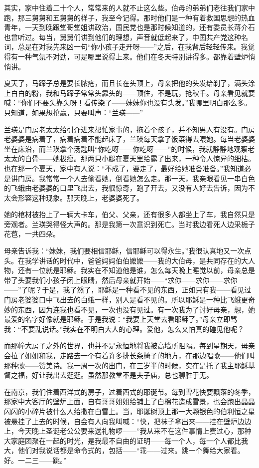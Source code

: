 \par 其实，家中住着二十个人，常常来的人就不止这么些。伯母的弟弟们老往我们家中跑，那三舅舅和五舅舅的样子，我至今记得。那时他们是一种有着救国思想的热血青年，一天到晚跟堂哥堂姐讲政治，国民党也是那时候知道的，还有委员长蒋介石也曾听过。每当，舅舅们讲到他们的理想，声音就低起来了，中国共产党这种名词，总是在对我先来凶一句“你小孩子走开呀——”之后，在我背后轻轻传来。我觉得有一种气氛不对劲，可是哪里说得上来。他们在冬天特别讲得多。都靠着壁炉悄悄讲。
\par 夏天了，马蹄子总是要长脓疮，而且长在头顶上，母亲把他的头发给剃了，满头涂上白白的粉，我和马蹄子常常头靠头的——顶住，不是玩，抢秋千。母亲看见就要喊：“你们不要头靠头呀！看传染了——妹妹你也没有头发。”我哪里明白那么多。只知道，如果想抢赢，只要叫声：“兰瑛——”
\par 兰瑛是门房老太太给引介进来帮忙家事的，拖着个孩子，并不知男人有没有。门房老婆婆是病着了，病着病着不能起床了，兰瑛每天拿了饭菜得去喂她。每当老婆婆坐在床沿，而兰瑛拿个汤匙叫“你吃呀——你吃呀——”的时候，我就静静地观察老太太的白骨——她极瘦。那两只小腿在夏天里给露了出来，一种令人惊异的细枯。也在那一个夏天，家中有人说：“不成了，要走了，最好给她准备准备。”我知道必是讲门房。我常常一个人去偷看她，倒看她怎么走。那一天，我亲眼看见一串白色的飞蛾由老婆婆的口里飞出去，我很惊奇，跑了开去，又没有人好去告诉，因为不太会形容这种现象。那天晚上，老婆婆死了。
\par 她的棺材被抬上了一辆大卡车，伯父、父亲，还有很多人都坐上了车，我自然只是旁观者。兰瑛哭得怪大声的。那是我第一次意识到死亡。当时我边看死人边采栀子花苞，一共四朵。
\par 母亲告诉我：“妹妹，我们要相信耶稣，信耶稣可以得永生。”我很认真地又一次点头。在我学讲话的时代中，爸爸妈妈伯伯嬷嬷——我的大伯母，是共同存在的大人物，还有一位就是耶稣。我实在不知道他是谁，怎么每天晚上睡觉以前，母亲总是带了头要我们小孩子闭上眼睛，然后母亲就开始——“求你——求你——求你——”了呢？于是，我了然了，耶稣是一种看不见的东西，正如只有我——看见过门房老婆婆口中飞出去的白蛾一样，别人是看不见的。所以耶稣是一种比飞蛾更奇妙的东西，因为连我也看不见，一次也没有见过。有一次我为了讨好母亲，想，她最爱的名字好像就是耶稣。于是我说：“我要上天堂去看耶稣了。”母亲立即骂我：“不要乱说话。”我实在不明白大人的心理。爱他，怎么又怕真的碰见他呢？
\par 而那幢大房子之外的世界，也并不是永恒地将我被高墙所阻隔。每到星期天，母亲会拉了姐姐和我，走路去一个有着许多排长条椅子的地方，在那边唱歌——他们叫那种歌——赞美诗。我一周一次的出门，在三岁半的时候，实在是托了我主耶稣基督之福，好让我出去逛逛。虽然那教堂不是夫子庙，总也聊胜于无。
\par 在南京，我们住着西洋式的房子，过着西式的耶诞节。每到雪花快要飘落的冬季，那家中大客厅的壁炉上面，自有哥哥姐姐给铺上了白棉花造成雪景，也会跑出晶晶闪闪的小碎片被什么人给撒在白雪上。当，耶诞树顶上那一大颗银色的伯利恒之星被悬挂了上去的时候，自会有人向我叫喊：“快，把袜子拿出来——挂在壁炉边边上，今天晚上圣诞老公公要来送礼物啰——”我从来不在这件事情上费过心，那种大家庭团聚在一起的时光，是我最不自由的证明——每一个人，每一个人都比我大，他们对我说话都是命令式的，包括——“乖——过来。跳一个舞给大家看。好。一二三——跳。”
